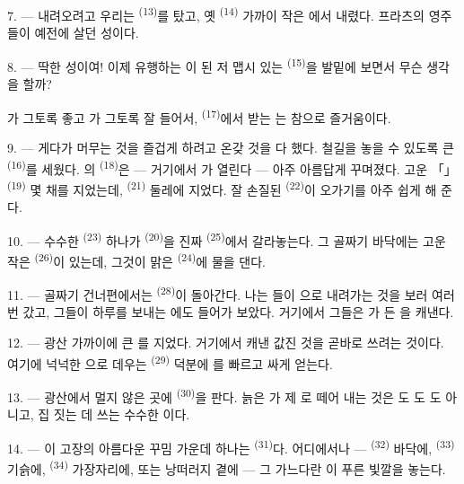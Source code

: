 7. --- 내려오려고 우리는  \textsuperscript{(13)}를 탔고, 옛
  \textsuperscript{(14)} 가까이 작은 에서 내렸다.
프라츠의 영주들이 예전에 살던 성이다.

8. --- 딱한 성이여! 이제 유행하는 이 된 저 맵시 있는
 \textsuperscript{(15)}을 발밑에 보면서 무슨 생각을 할까?

가 그토록 좋고 가 그토록 잘 들어서, 
\textsuperscript{(17)}에서 받는 는 참으로 즐거움이다.

\VUsaut{3.0mm}
\VUsaut{3.0mm}

9. --- 게다가 머무는 것을 즐겁게 하려고 온갖 것을 다 했다. 철길을 놓을 수 있도록 큰
 \textsuperscript{(16)}를 세웠다. 의
 \textsuperscript{(18)}은 — 거기에서 가 열린다 — 아주
아름답게 꾸며졌다. 고운 「」 \textsuperscript{(19)} 몇 채를 지었는데,
 \textsuperscript{(21)} 둘레에 지었다. 잘 손질된 
\textsuperscript{(22)}이 오가기를 아주 쉽게 해 준다.

10. --- 수수한  \textsuperscript{(23)} 하나가  \textsuperscript{(20)}을
진짜  \textsuperscript{(25)}에서 갈라놓는다. 그 골짜기 바닥에는 고운 작은
 \textsuperscript{(26)}이 있는데, 그것이 맑은  \textsuperscript{(24)}에
물을 댄다.

11. --- 골짜기 건너편에서는  \textsuperscript{(28)}이 돌아간다. 나는
들이 으로 내려가는 것을 보러 여러 번 갔고, 그들이 하루를
보내는 에도 들어가 보았다. 거기에서 그들은 가 든
을 캐낸다.

12. --- 광산 가까이에 큰 를 지었다. 거기에서 캐낸 값진 것을 곧바로
쓰려는 것이다. 여기에 넉넉한 으로 데우는  \textsuperscript{(29)}
덕분에 를 빠르고 싸게 얻는다.

13. --- 광산에서 멀지 않은 곳에  \textsuperscript{(30)}을 판다. 늙은
가 제 로 떼어 내는 것은 도 도
도 아니고, 집 짓는 데 쓰는 수수한 이다.

14. --- 이 고장의 아름다운 꾸밈 가운데 하나는  \textsuperscript{(31)}다.
어디에서나 —  \textsuperscript{(32)} 바닥에, 
\textsuperscript{(33)} 기슭에,  \textsuperscript{(34)} 가장자리에, 또는
낭떠러지 곁에 — 그 가느다란 이 푸른 빛깔을 놓는다.

